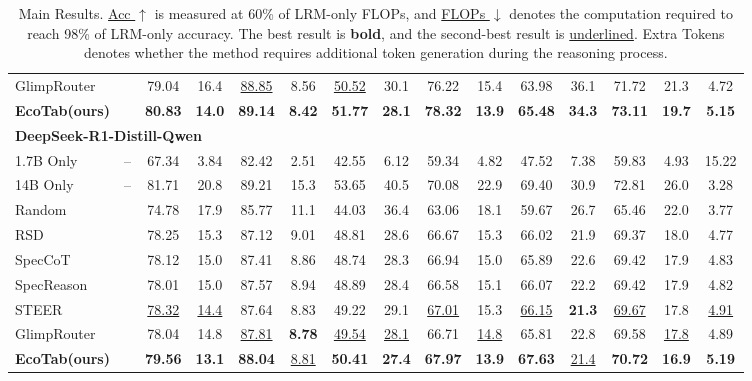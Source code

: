 \documentclass[11pt]{article}
\newcommand{\cmark}{\ding{51}} %
\newcommand{\xmark}{\ding{55}} %
\begin{document}
\begin{table}[t]
{\begin{tabular}{lccccccccccc|>{\columncolor{avggray}}c>{\columncolor{avggray}}c>{\columncolor{avggray}}c}
GlimpRouter& \cmark & 79.04 & 16.4 & \underline{88.85} & 8.56 & \underline{50.52} & 30.1 & 76.22 & 15.4 & 63.98 & 36.1 & 71.72 & 21.3 & 4.72\\
\rowcolor[HTML]{D8ECE4}
\textbf{EcoTab(ours)}& \xmark & \textbf{80.83} & \textbf{14.0} & \textbf{89.14} & \textbf{8.42} & \textbf{51.77} & \textbf{28.1} & \textbf{78.32} & \textbf{13.9} & \textbf{65.48} & \textbf{34.3} & \textbf{73.11} & \textbf{19.7} & \textbf{5.15}\\
\midrule
\multicolumn{14}{l}{\textbf{DeepSeek-R1-Distill-Qwen}}\\
\midrule\midrule
1.7B Only & -- & 67.34 & 3.84 & 82.42 & 2.51 & 42.55 & 6.12 & 59.34 & 4.82 & 47.52 & 7.38 & 59.83 & 4.93 & 15.22\\
14B Only& -- & 81.71 & 20.8 & 89.21 & 15.3 & 53.65 & 40.5  & 70.08 & 22.9 & 69.40 & 30.9 & 72.81 & 26.0 & 3.28\\
\midrule
Random & \xmark      & 74.78 & 17.9 & 85.77 & 11.1 & 44.03 & 36.4 & 63.06 & 18.1 & 59.67 & 26.7 & 65.46 & 22.0 & 3.77\\
RSD& \cmark & 78.25 & 15.3 & 87.12 & 9.01 & 48.81 & 28.6 & 66.67 & 15.3 & 66.02 & 21.9 & 69.37 & 18.0 & 4.77\\
SpecCoT& \cmark & 78.12 & 15.0 & 87.41 & 8.86 & 48.74 & 28.3 & 66.94 & 15.0 & 65.89 & 22.6 & 69.42 & 17.9 & 4.83\\
SpecReason& \cmark & 78.01 & 15.0 & 87.57 & 8.94 & 48.89 & 28.4 & 66.58 & 15.1 & 66.07 & 22.2 & 69.42 & 17.9 & 4.82\\
STEER& \xmark & \underline{78.32} & \underline{14.4} & 87.64 & 8.83 & 49.22 & 29.1 & \underline{67.01} & 15.3 & \underline{66.15} & \textbf{21.3} & \underline{69.67} & 17.8 & \underline{4.91}\\
GlimpRouter& \cmark & 78.04 & 14.8 & \underline{87.81} & \textbf{8.78} & \underline{49.54} & \underline{28.1} & 66.71 & \underline{14.8} & 65.81 & 22.8 & 69.58 & \underline{17.8} & 4.89\\
\rowcolor[HTML]{D8ECE4}
\textbf{EcoTab(ours)}& \xmark & \textbf{79.56} & \textbf{13.1} & \textbf{88.04} & \underline{8.81} & \textbf{50.41} & \textbf{27.4} & \textbf{67.97} & \textbf{13.9} & \textbf{67.63} & \underline{21.4} & \textbf{70.72} & \textbf{16.9} & \textbf{5.19} \\

\bottomrule
\end{tabular}%
}
\caption{
Main Results. {\footnotesize\underline{Acc $\uparrow$}} is measured at 60\% of LRM-only FLOPs, and {\footnotesize\underline{FLOPs $\downarrow$}} denotes the computation required to reach 98\% of LRM-only accuracy. The best result is \textbf{bold}, and the second-best result is \underline{underlined}. Extra Tokens denotes whether the method requires additional token generation during the reasoning process.
}
\label{tab:main-exp2}
\vspace{-14pt}
\end{table}
\end{document}
